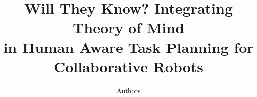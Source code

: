 \documentclass[letterpaper]{article} %
\title
{
Will They Know? Integrating Theory of Mind \\ in Human Aware Task Planning for Collaborative Robots
}
\author{
    Authors
}
\begin{document}


\maketitle

\begin{abstract}



\end{abstract}
\end{document}
